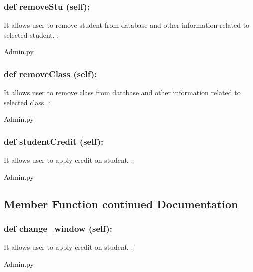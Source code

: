 \hypertarget{class_poly_a14a7ad77ce612b0c54f531d307ee4b39}{
\subsubsection[{def removeStu(self):}]{\setlength{\rightskip}{0pt plus 5cm}def {removeStu} (self):}}\label{class_poly_a14a7ad77ce612b0c54f531d307ee4b39}
It allows user to remove student from database and other information related to selected student.
:\begin{DoxyCompactItemize}
\item 
Admin.\-py\end{DoxyCompactItemize}

\hypertarget{class_poly_a14a7ad77ce612b0c54f531d307ee4b39}{
\subsubsection[{def removeClass(self):}]{\setlength{\rightskip}{0pt plus 5cm}def {removeClass} (self):}}\label{class_poly_a14a7ad77ce612b0c54f531d307ee4b39}
It allows user to remove class from database and other information related to selected class.
:\begin{DoxyCompactItemize}
\item 
Admin.\-py\end{DoxyCompactItemize}

\hypertarget{class_poly_a14a7ad77ce612b0c54f531d307ee4b39}{
\subsubsection[{def studentCredit(self):}]{\setlength{\rightskip}{0pt plus 5cm}def {studentCredit} (self):}}\label{class_poly_a14a7ad77ce612b0c54f531d307ee4b39}
It allows user to apply credit on student.
:\begin{DoxyCompactItemize}
\item 
Admin.\-py\end{DoxyCompactItemize}

\subsection{Member Function continued Documentation}

\hypertarget{class_poly_a14a7ad77ce612b0c54f531d307ee4b39}{
\subsubsection[{def change_window(self):}]{\setlength{\rightskip}{0pt plus 5cm}def {change\_window} (self):}}\label{class_poly_a14a7ad77ce612b0c54f531d307ee4b39}
It allows user to apply credit on student.
:\begin{DoxyCompactItemize}
\item 
Admin.\-py\end{DoxyCompactItemize}

